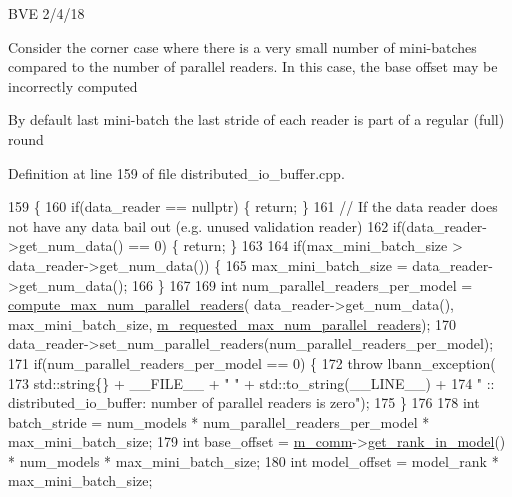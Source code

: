B\+VE 2/4/18

Consider the corner case where there is a very small number of mini-\/batches compared to the number of parallel readers. In this case, the base offset may be incorrectly computed

By default last mini-\/batch the last stride of each reader is part of a regular (full) round 

Definition at line 159 of file distributed\+\_\+io\+\_\+buffer.\+cpp.


\begin{DoxyCode}
159                                                                                                            
                                                        \{
160   \textcolor{keywordflow}{if}(data\_reader == \textcolor{keyword}{nullptr}) \{ \textcolor{keywordflow}{return}; \}
161   \textcolor{comment}{// If the data reader does not have any data bail out (e.g. unused validation reader)}
162   \textcolor{keywordflow}{if}(data\_reader->get\_num\_data() == 0) \{ \textcolor{keywordflow}{return}; \}
163 
164   \textcolor{keywordflow}{if}(max\_mini\_batch\_size > data\_reader->get\_num\_data()) \{
165     max\_mini\_batch\_size = data\_reader->get\_num\_data();
166   \}
167 
169   \textcolor{keywordtype}{int} num\_parallel\_readers\_per\_model = \hyperlink{classlbann_1_1distributed__io__buffer_af6653723714cf8cf51a928fc9f6e6728}{compute\_max\_num\_parallel\_readers}(
      data\_reader->get\_num\_data(), max\_mini\_batch\_size, 
      \hyperlink{classlbann_1_1distributed__io__buffer_aa14580fd9d0e8806dc161745525a60dc}{m\_requested\_max\_num\_parallel\_readers});
170   data\_reader->set\_num\_parallel\_readers(num\_parallel\_readers\_per\_model);
171   \textcolor{keywordflow}{if}(num\_parallel\_readers\_per\_model == 0) \{
172     \textcolor{keywordflow}{throw} lbann\_exception(
173       std::string\{\} + \_\_FILE\_\_ + \textcolor{stringliteral}{" "} + std::to\_string(\_\_LINE\_\_) +
174       \textcolor{stringliteral}{" :: distributed\_io\_buffer: number of parallel readers is zero"});
175   \}
176 
178   \textcolor{keywordtype}{int} batch\_stride = num\_models * num\_parallel\_readers\_per\_model * max\_mini\_batch\_size;
179   \textcolor{keywordtype}{int} base\_offset = \hyperlink{classlbann_1_1generic__io__buffer_a2e4a46c85c8b30e10b1cc5acaa2c4cca}{m\_comm}->\hyperlink{classlbann_1_1lbann__comm_a789453454468a3b70de768537c50ca52}{get\_rank\_in\_model}() * num\_models * max\_mini\_batch\_size;
180   \textcolor{keywordtype}{int} model\_offset = model\_rank * max\_mini\_batch\_size;

\end{DoxyCode}
